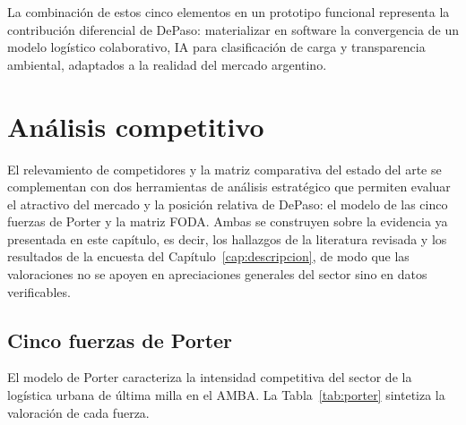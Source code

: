 La combinación de estos cinco elementos en un prototipo funcional representa la contribución diferencial de DePaso: materializar en software la convergencia de un modelo logístico colaborativo, IA para clasificación de carga y transparencia ambiental, adaptados a la realidad del mercado argentino.

{\color{nuevo}%
\section{Análisis competitivo}

El relevamiento de competidores y la matriz comparativa del estado del arte se complementan con dos herramientas de análisis estratégico que permiten evaluar el atractivo del mercado y la posición relativa de DePaso: el modelo de las cinco fuerzas de Porter y la matriz FODA. Ambas se construyen sobre la evidencia ya presentada en este capítulo, es decir, los hallazgos de la literatura revisada y los resultados de la encuesta del Capítulo~\ref{cap:descripcion}, de modo que las valoraciones no se apoyen en apreciaciones generales del sector sino en datos verificables.

\subsection{Cinco fuerzas de Porter}

El modelo de Porter caracteriza la intensidad competitiva del sector de la logística urbana de última milla en el AMBA. La Tabla~\ref{tab:porter} sintetiza la valoración de cada fuerza.

}
